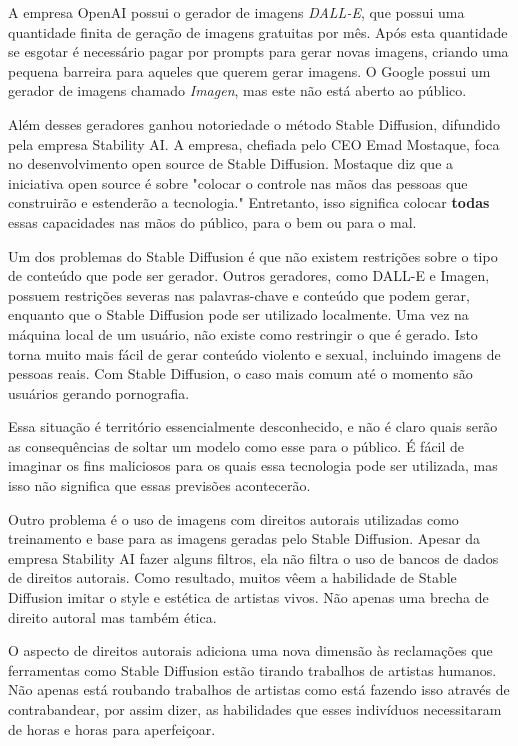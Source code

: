A empresa OpenAI possui o gerador de imagens \textit{DALL-E}, que possui uma quantidade finita de geração de imagens gratuitas por mês. Após esta quantidade se esgotar é necessário pagar por prompts para gerar novas imagens, criando uma pequena barreira para aqueles que querem gerar imagens. O Google possui um gerador de imagens chamado \textit{Imagen}, mas este não está aberto ao público.



Além desses geradores ganhou notoriedade o método Stable Diffusion, difundido pela empresa Stability AI. A empresa, chefiada pelo CEO Emad Mostaque, foca no desenvolvimento open source de Stable Diffusion. Mostaque diz que a iniciativa open source é sobre "colocar o controle nas mãos das pessoas que construirão e estenderão a tecnologia." Entretanto, isso significa colocar \textbf{todas} essas capacidades nas mãos do público, para o bem ou para o mal.



Um dos problemas do Stable Diffusion é que não existem restrições sobre o tipo de conteúdo que pode ser gerador. Outros geradores, como DALL-E e Imagen, possuem restrições severas nas palavras-chave e conteúdo que podem gerar, enquanto que o Stable Diffusion pode ser utilizado localmente. Uma vez na máquina local de um usuário, não existe como restringir o que é gerado. Isto torna muito mais fácil de gerar conteúdo violento e sexual, incluindo imagens de pessoas reais. Com Stable Diffusion, o caso mais comum até o momento são usuários gerando pornografia.



Essa situação é território essencialmente desconhecido, e não é claro quais serão as consequências de soltar um modelo como esse para o público. É fácil de imaginar os fins maliciosos para os quais essa tecnologia pode ser utilizada, mas isso não significa que essas previsões acontecerão.



Outro problema é o uso de imagens com direitos autorais utilizadas como treinamento e base para as imagens geradas pelo Stable Diffusion. Apesar da empresa Stability AI fazer alguns filtros, ela não filtra o uso de bancos de dados de direitos autorais. Como resultado, muitos vêem a habilidade de Stable Diffusion imitar o style e estética de artistas vivos. Não apenas uma brecha de direito autoral mas também ética.



O aspecto de direitos autorais adiciona uma nova dimensão às reclamações que ferramentas como Stable Diffusion estão tirando trabalhos de artistas humanos. Não apenas está roubando trabalhos de artistas como está fazendo isso através de contrabandear, por assim dizer, as habilidades que esses indivíduos necessitaram de horas e horas para aperfeiçoar.
